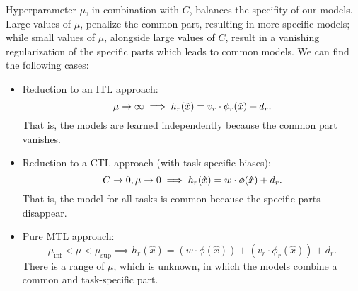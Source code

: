 %
Hyperparameter $\mu$, in combination with $C$, balances the specifity of our models. 
Large values of $\mu$, penalize the common part, resulting in more specific models; while small values of $\mu$, alongside large values of $C$, result in a vanishing regularization of the specific parts which leads to common models.
We can find the following cases:
\begin{itemize}
    \item Reduction to an ITL approach:
    $$\mu \xrightarrow[]{} \infty \implies h_r(\hat{x}) = {v}_r \cdot \phi_r(\hat{x}) + d_r .$$
    That is, the models are learned independently because the common part vanishes.
    \item Reduction to a CTL approach (with task-specific biases): 
    $$C \xrightarrow[]{} 0, \mu \xrightarrow[]{} 0 \implies h_r(\hat{x}) = {w} \cdot \phi(\hat{x}) + d_r .$$
    That is, the model for all tasks is common because the specific parts disappear.
    \item Pure MTL approach:
    $$ \mu_\text{inf} < \mu < \mu_\text{sup} \implies h_r(\hat{x}) =({w} \cdot \phi(\hat{x}) ) + ({v}_r \cdot \phi_r(\hat{x})) + d_r .$$
    There is a range of $\mu$, which is unknown, in which the models combine a common and task-specific part.
\end{itemize}

